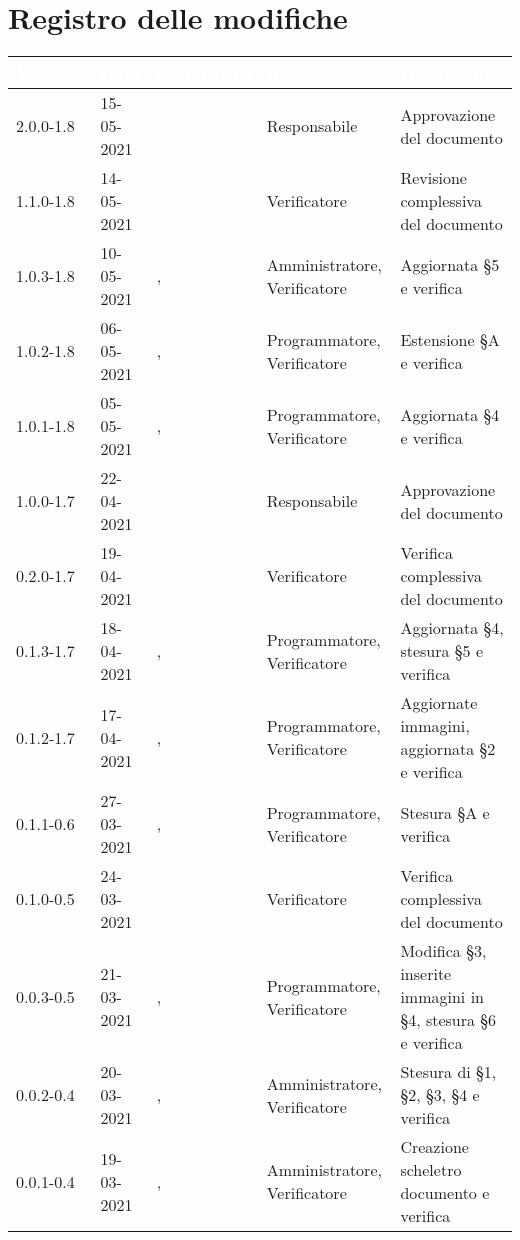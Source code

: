 \section*{Registro delle modifiche}
\setcounter{table}{-1}
{
\renewcommand{\arraystretch}{1.5}
\centering
\begin{longtable}{C{1.7cm} | C{2.2cm} | C{3.2cm} | C{3cm} | C{4.8cm}}
\textcolor{white}{\textbf{Versione}}&
\textcolor{white}{\textbf{Data}}&
\textcolor{white}{\textbf{Nominativo}}&
\textcolor{white}{\textbf{Ruolo}}&
\textcolor{white}{\textbf{Descrizione}}\\	
\endhead

2.0.0-1.8 & 15-05-2021 & \SP{} & Responsabile & Approvazione del documento \\
1.1.0-1.8 & 14-05-2021 & \ZM{} & Verificatore & Revisione complessiva del documento \\
1.0.3-1.8 & 10-05-2021 & \BM{}, \PA{} & Amministratore, Verificatore & Aggiornata \S 5 e verifica \\
1.0.2-1.8 & 06-05-2021 & \SG{}, \PA{} & Programmatore, Verificatore & Estensione \S A e verifica \\
1.0.1-1.8 & 05-05-2021 & \SG{}, \PA{} & Programmatore, Verificatore & Aggiornata \S 4 e verifica \\ 
1.0.0-1.7 & 22-04-2021 & \RA{} & Responsabile & Approvazione del documento \\
0.2.0-1.7 & 19-04-2021 & \BM{} & Verificatore & Verifica complessiva del documento \\

0.1.3-1.7 & 18-04-2021 & \SH{}, \BM{} & Programmatore, Verificatore & Aggiornata \S 4, stesura \S 5 e verifica \\

0.1.2-1.7 & 17-04-2021 & \SH{}, \SG{} & Programmatore, Verificatore & Aggiornate immagini, aggiornata \S 2 e verifica \\

0.1.1-0.6 & 27-03-2021 & \SG{}, \SH{} & Programmatore, Verificatore & Stesura \S A e verifica \\
0.1.0-0.5 & 24-03-2021 & \SP{} & Verificatore & Verifica complessiva del documento \\
0.0.3-0.5 & 21-03-2021 & \BM{}, \SH{} & Programmatore, Verificatore & Modifica \S 3, inserite immagini in \S 4, stesura \S 6 e verifica \\
0.0.2-0.4 & 20-03-2021 & \SG{}, \PA{}   & Amministratore, Verificatore & Stesura di \S 1, \S 2, \S 3, \S 4 e verifica \\
0.0.1-0.4 & 19-03-2021 & \SG{}, \ZM{} & Amministratore, Verificatore & Creazione scheletro documento e verifica\\
		
\end{longtable}
}